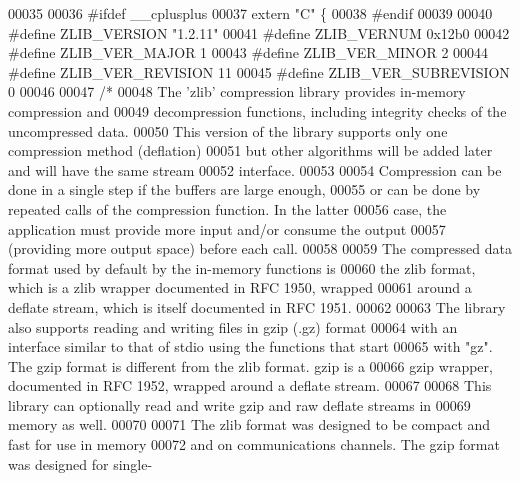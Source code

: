 \begin{DoxyCode}
00035 
00036 \textcolor{preprocessor}{#ifdef \_\_cplusplus}
00037 \textcolor{keyword}{extern} \textcolor{stringliteral}{"C"} \{
00038 \textcolor{preprocessor}{#endif}
00039 
00040 \textcolor{preprocessor}{#define ZLIB\_VERSION "1.2.11"}
00041 \textcolor{preprocessor}{#define ZLIB\_VERNUM 0x12b0}
00042 \textcolor{preprocessor}{#define ZLIB\_VER\_MAJOR 1}
00043 \textcolor{preprocessor}{#define ZLIB\_VER\_MINOR 2}
00044 \textcolor{preprocessor}{#define ZLIB\_VER\_REVISION 11}
00045 \textcolor{preprocessor}{#define ZLIB\_VER\_SUBREVISION 0}
00046 
00047 \textcolor{comment}{/*}
00048 \textcolor{comment}{    The 'zlib' compression library provides in-memory compression and}
00049 \textcolor{comment}{  decompression functions, including integrity checks of the uncompressed data.}
00050 \textcolor{comment}{  This version of the library supports only one compression method (deflation)}
00051 \textcolor{comment}{  but other algorithms will be added later and will have the same stream}
00052 \textcolor{comment}{  interface.}
00053 \textcolor{comment}{}
00054 \textcolor{comment}{    Compression can be done in a single step if the buffers are large enough,}
00055 \textcolor{comment}{  or can be done by repeated calls of the compression function.  In the latter}
00056 \textcolor{comment}{  case, the application must provide more input and/or consume the output}
00057 \textcolor{comment}{  (providing more output space) before each call.}
00058 \textcolor{comment}{}
00059 \textcolor{comment}{    The compressed data format used by default by the in-memory functions is}
00060 \textcolor{comment}{  the zlib format, which is a zlib wrapper documented in RFC 1950, wrapped}
00061 \textcolor{comment}{  around a deflate stream, which is itself documented in RFC 1951.}
00062 \textcolor{comment}{}
00063 \textcolor{comment}{    The library also supports reading and writing files in gzip (.gz) format}
00064 \textcolor{comment}{  with an interface similar to that of stdio using the functions that start}
00065 \textcolor{comment}{  with "gz".  The gzip format is different from the zlib format.  gzip is a}
00066 \textcolor{comment}{  gzip wrapper, documented in RFC 1952, wrapped around a deflate stream.}
00067 \textcolor{comment}{}
00068 \textcolor{comment}{    This library can optionally read and write gzip and raw deflate streams in}
00069 \textcolor{comment}{  memory as well.}
00070 \textcolor{comment}{}
00071 \textcolor{comment}{    The zlib format was designed to be compact and fast for use in memory}
00072 \textcolor{comment}{  and on communications channels.  The gzip format was designed for single-}

\end{DoxyCode}
